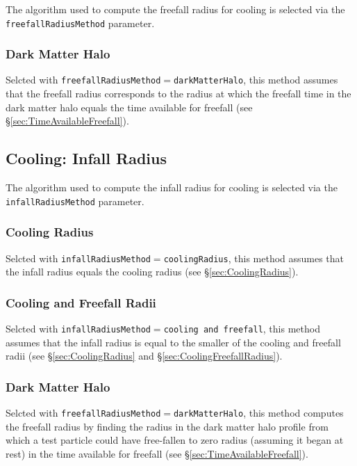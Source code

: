 The algorithm used to compute the freefall radius for cooling is selected via the {\tt freefallRadiusMethod} parameter.

\subsubsection{Dark Matter Halo}

Selcted with {\tt freefallRadiusMethod}$=${\tt darkMatterHalo}, this method assumes that the freefall radius corresponds to the radius at which the freefall time in the dark matter halo equals the time available for freefall (see \S\ref{sec:TimeAvailableFreefall}).

\subsection{Cooling: Infall Radius}\label{sec:CoolingInfallRadius}

The algorithm used to compute the infall radius for cooling is selected via the {\tt infallRadiusMethod} parameter.

\subsubsection{Cooling Radius}

Selcted with {\tt infallRadiusMethod}$=${\tt coolingRadius}, this method assumes that the infall radius equals the cooling radius (see \S\ref{sec:CoolingRadius}).

\subsubsection{Cooling and Freefall Radii}

Selcted with {\tt infallRadiusMethod}$=${\tt cooling and freefall}, this method assumes that the infall radius is equal to the smaller of the cooling and freefall radii (see \S\ref{sec:CoolingRadius} and \S\ref{sec:CoolingFreefallRadius}).

\subsubsection{Dark Matter Halo}

Selcted with {\tt freefallRadiusMethod}$=${\tt darkMatterHalo}, this method computes the freefall radius by finding the radius in the dark matter halo profile from which a test particle could have free-fallen to zero radius (assuming it began at rest) in the time available for freefall (see \S\ref{sec:TimeAvailableFreefall}).


